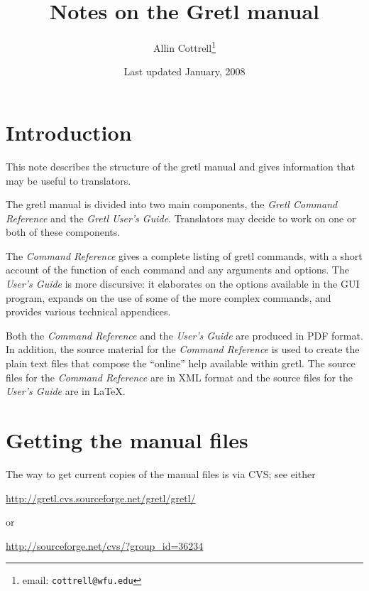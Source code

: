\documentclass{article}
\begin{document}
\title{Notes on the Gretl manual}
\author{Allin Cottrell\thanks{email: \texttt{cottrell@wfu.edu}}}
\date{Last updated January, 2008}

\maketitle

\setcounter{tocdepth}{1}
\tableofcontents

\section{Introduction}

This note describes the structure of the \textsf{gretl} manual and
gives information that may be useful to translators.

The gretl manual is divided into two main components, the
\textit{Gretl Command Reference} and the \textit{Gretl User's Guide}.
Translators may decide to work on one or both of these components.

The \textit{Command Reference} gives a complete listing of
\textsf{gretl} commands, with a short account of the function of each
command and any arguments and options.  The \textit{User's Guide} is
more discursive: it elaborates on the options available in the GUI
program, expands on the use of some of the more complex commands, and
provides various technical appendices.

Both the \textit{Command Reference} and the \textit{User's Guide} are
produced in PDF format.  In addition, the source material for the
\textit{Command Reference} is used to create the plain text files that
compose the ``online'' help available within \textsf{gretl}.  The
source files for the \textit{Command Reference} are in XML format and
the source files for the \textit{User's Guide} are in \LaTeX.

\section{Getting the manual files}
\label{getit}

The way to get current copies of the manual files is via CVS; see
either 
%
\begin{center}
\url{http://gretl.cvs.sourceforge.net/gretl/gretl/}
\end{center}
%
or 
%
\begin{center}
\url{http://sourceforge.net/cvs/?group_id=36234}
\end{center}
\end{document}
